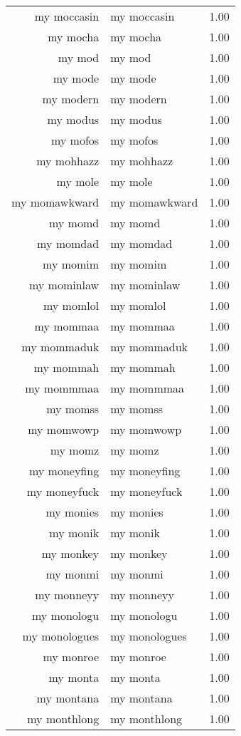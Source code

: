 \begin{table}[ht]
\begin{tabular}{rlr}
  my moccasin & my moccasin & 1.00 \\ 
  my mocha & my mocha & 1.00 \\ 
  my mod & my mod & 1.00 \\ 
  my mode & my mode & 1.00 \\ 
  my modern & my modern & 1.00 \\ 
  my modus & my modus & 1.00 \\ 
  my mofos & my mofos & 1.00 \\ 
  my mohhazz & my mohhazz & 1.00 \\ 
  my mole & my mole & 1.00 \\ 
  my momawkward & my momawkward & 1.00 \\ 
  my momd & my momd & 1.00 \\ 
  my momdad & my momdad & 1.00 \\ 
  my momim & my momim & 1.00 \\ 
  my mominlaw & my mominlaw & 1.00 \\ 
  my momlol & my momlol & 1.00 \\ 
  my mommaa & my mommaa & 1.00 \\ 
  my mommaduk & my mommaduk & 1.00 \\ 
  my mommah & my mommah & 1.00 \\ 
  my mommmaa & my mommmaa & 1.00 \\ 
  my momss & my momss & 1.00 \\ 
  my momwowp & my momwowp & 1.00 \\ 
  my momz & my momz & 1.00 \\ 
  my moneyfing & my moneyfing & 1.00 \\ 
  my moneyfuck & my moneyfuck & 1.00 \\ 
  my monies & my monies & 1.00 \\ 
  my monik & my monik & 1.00 \\ 
  my monkey & my monkey & 1.00 \\ 
  my monmi & my monmi & 1.00 \\ 
  my monneyy & my monneyy & 1.00 \\ 
  my monologu & my monologu & 1.00 \\ 
  my monologues & my monologues & 1.00 \\ 
  my monroe & my monroe & 1.00 \\ 
  my monta & my monta & 1.00 \\ 
  my montana & my montana & 1.00 \\ 
  my monthlong & my monthlong & 1.00 \\ 

\end{tabular}
\end{table}
